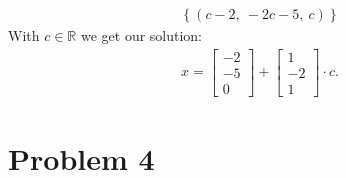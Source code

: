 \documentclass[letterpaper,10pt,english]{jupyterBook}
\begin{document}
\begin{sphinxVerbatim}[commandchars=\\\{\}]
    
   
       
\end{sphinxVerbatim}
\begin{equation*}
\begin{split}\displaystyle \left\{\left( c - 2, \  - 2 c - 5, \  c\right)\right\}\end{split}
\end{equation*}
\sphinxAtStartPar
With \(c \in \mathbb{R}\) we get our solution:
\begin{equation*}
\begin{split}
x =
\begin{bmatrix}
-2\\
-5\\
0
\end{bmatrix}
+
\begin{bmatrix}
1\\
-2\\
1
\end{bmatrix}
\cdot
c.
\end{split}
\end{equation*}

\section{Problem 4}
\label{\detokenize{notebooks/ProblemSet2:problem-4}}






\renewcommand{\indexname}{Index}
\printindex
\end{document}
